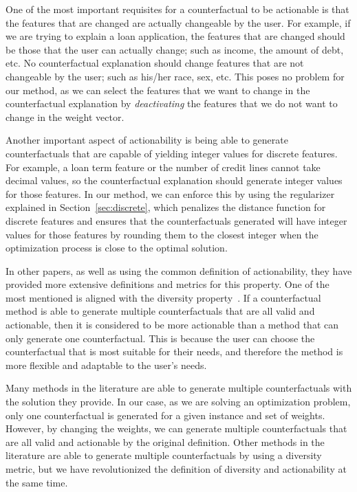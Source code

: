 \documentclass[12pt]{extarticle}
\numberwithin{equation}{section}
\begin{document}
One of the most important requisites for a counterfactual to be actionable is that the features that are changed are actually changeable by the user. For example, if we are trying to explain a loan application, the features that are changed should be those that the user can actually change; such as income, the amount of debt, etc. No counterfactual explanation should change features that are not changeable by the user; such as his/her race, sex, etc. This poses no problem for our method, as we can select the features that we want to change in the counterfactual explanation by \emph{deactivating} the features that we do not want to change in the weight vector. 

Another important aspect of actionability is being able to generate counterfactuals that are capable of yielding integer values for discrete features. For example, a loan term feature or the number of credit lines cannot take decimal values, so the counterfactual explanation should generate integer values for those features. In our method, we can enforce this by using the regularizer explained in Section~\ref{sec:discrete}, which penalizes the distance function for discrete features and ensures that the counterfactuals generated will have integer values for those features by rounding them to the closest integer when the optimization process is close to the optimal solution.

In other papers, as well as using the common definition of actionability, they have provided more extensive definitions and metrics for this property. One of the most mentioned is aligned with the diversity property~\cite{dice}. If a counterfactual method is able to generate multiple counterfactuals that are all valid and actionable, then it is considered to be more actionable than a method that can only generate one counterfactual. This is because the user can choose the counterfactual that is most suitable for their needs, and therefore the method is more flexible and adaptable to the user's needs. 

Many methods in the literature are able to generate multiple counterfactuals with the  solution they provide. In our case, as we are solving an optimization problem, only one counterfactual is generated for a given instance and set of weights. However, by changing the weights, we can generate multiple counterfactuals that are all valid and actionable by the original definition. Other methods in the literature are able to generate multiple counterfactuals by using a diversity metric, but we have revolutionized the definition of diversity and actionability at the same time. 
\end{document}

